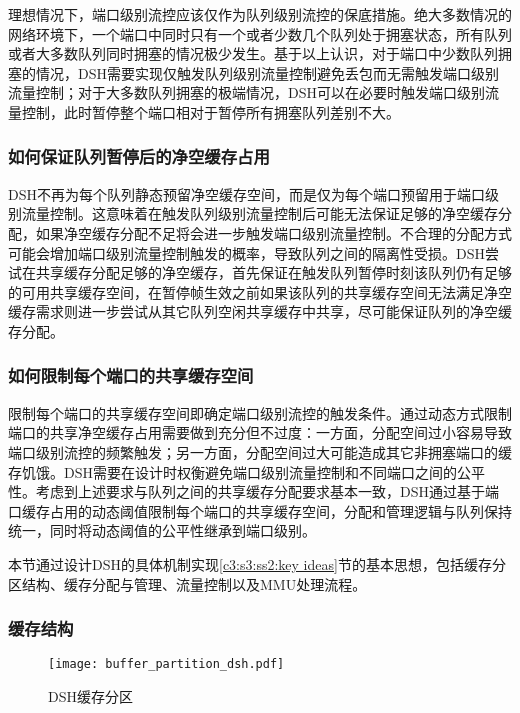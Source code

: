 理想情况下，端口级别流控应该仅作为队列级别流控的保底措施。绝大多数情况的网络环境下，一个端口中同时只有一个或者少数几个队列处于拥塞状态，所有队列或者大多数队列同时拥塞的情况极少发生。基于以上认识，对于端口中少数队列拥塞的情况，DSH需要实现仅触发队列级别流量控制避免丢包而无需触发端口级别流量控制；对于大多数队列拥塞的极端情况，DSH可以在必要时触发端口级别流量控制，此时暂停整个端口相对于暂停所有拥塞队列差别不大。

\subsubsection{如何保证队列暂停后的净空缓存占用}

DSH不再为每个队列静态预留净空缓存空间，而是仅为每个端口预留用于端口级别流量控制。这意味着在触发队列级别流量控制后可能无法保证足够的净空缓存分配，如果净空缓存分配不足将会进一步触发端口级别流量控制。不合理的分配方式可能会增加端口级别流量控制触发的概率，导致队列之间的隔离性受损。DSH尝试在共享缓存分配足够的净空缓存，首先保证在触发队列暂停时刻该队列仍有足够的可用共享缓存空间，在暂停帧生效之前如果该队列的共享缓存空间无法满足净空缓存需求则进一步尝试从其它队列空闲共享缓存中共享，尽可能保证队列的净空缓存分配。

\subsubsection{如何限制每个端口的共享缓存空间}

限制每个端口的共享缓存空间即确定端口级别流控的触发条件。通过动态方式限制端口的共享净空缓存占用需要做到充分但不过度：一方面，分配空间过小容易导致端口级别流控的频繁触发；另一方面，分配空间过大可能造成其它非拥塞端口的缓存饥饿。DSH需要在设计时权衡避免端口级别流量控制和不同端口之间的公平性。考虑到上述要求与队列之间的共享缓存分配要求基本一致，DSH通过基于端口缓存占用的动态阈值限制每个端口的共享缓存空间，分配和管理逻辑与队列保持统一，同时将动态阈值的公平性继承到端口级别。

\label{c3:s3:ss4:dsh mechanisms}

本节通过设计DSH的具体机制实现\ref{c3:s3:ss2:key ideas}节的基本思想，包括缓存分区结构、缓存分配与管理、流量控制以及MMU处理流程。

\subsubsection{缓存结构}

\begin{figure}[H]
  \centering
  \texttt{[image: buffer\_partition\_dsh.pdf]}
  \caption{DSH缓存分区}
  \label{c3:s3:ss4:fig:dsh buffer partition}
\end{figure}


